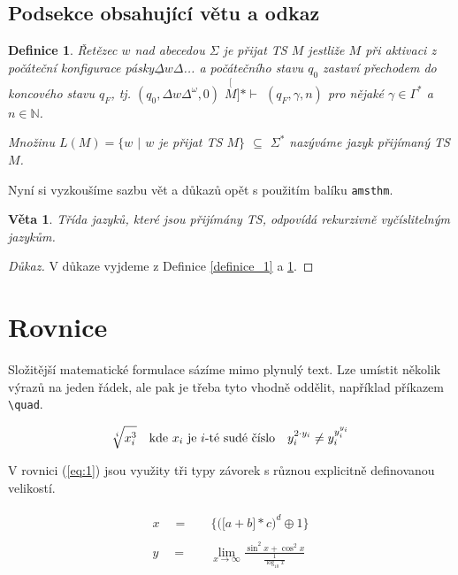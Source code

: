 \documentclass[a4paper, 11pt, twocolumn]{article}
\begin{document}
    \subsection{Podsekce obsahující větu a odkaz}
    \newtheorem{Def2}[Def1]{Definice}
    \begin{Def2}
    \label{definice_2}
        {\textnormal{Řetězec}} $w$ {\textnormal{nad abecedou}} $\Sigma$ {\textnormal{je přijat TS}} $M$ jestliže $M$ při aktivaci z počáteční konfigurace pásky\break $\underline{\Delta}w\Delta$... a počátečního stavu $q_0$ zastaví přechodem do koncového stavu $q_F$, tj. $(q_0, \Delta w\Delta^{\omega},0)$ ${\stackrel[M]{\ast}{\vdash}}$ $(q_F, \gamma, n)$ pro nějaké $\gamma \in \Gamma^{\ast}$ a $n \in  \mathbb{N}$.
        
        Množinu $L(M) = \{w$ $\vert$ $w$ je přijat TS $M\}$ $\subseteq$ $\Sigma^{\ast}$ nazýváme {\textnormal{jazyk přijímaný TS}} $M$.
    \end{Def2}
    Nyní si vyzkoušíme sazbu vět a důkazů opět s použitím
    balíku \texttt{amsthm}.
    
    \newtheorem{Veta}{Věta}
    \begin{Veta}
        Třída jazyků, které jsou přijímány TS, odpovídá
        {\textnormal{rekurzivně vyčíslitelným jazykům}}.
    \end{Veta}
    \begin{proof}[Důkaz]
        V důkaze vyjdeme z Definice \ref{definice_1} a \ref{definice_2}.
    \end{proof}
    
    \section{Rovnice}
        Složitější matematické formulace sázíme mimo plynulý
        text. Lze umístit několik výrazů na jeden řádek, ale pak je
        třeba tyto vhodně oddělit, například příkazem \verb!\quad!.
        
        $$
            \sqrt[i]{x^{3}_{i}} 
            \quad
            \textnormal{kde $x_i$ je $i$-té sudé číslo}
            \quad
            y^{2\cdot y_i}_i \neq y^{y^{y_i}_i}_i
        $$
        
        V rovnici (\ref{eq:1}) jsou využity tři typy závorek s různou
        explicitně definovanou velikostí.
        
        \begin{align}
            \begin{split}\label{eq:1}
            x\quad={}&\quad \bigg\{\Big(\big[a + b\big]\ast c\Big)^{d}\oplus 1\bigg\}
            \end{split}\\
            \begin{split}\label{eq:2}
            y\quad={}&\quad \lim\limits_{x\to\infty}\frac{\sin^{2}x + \cos^{2}x}{\frac{1}{\log_{10}{x}}}
            \end{split}
        \end{align}
        
\end{document}
